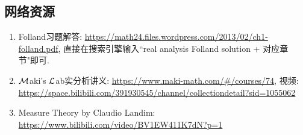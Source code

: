 \subsection*{网络资源}
\begin{enumerate}
    \item Folland习题解答: \url{https://math24.files.wordpress.com/2013/02/ch1-folland.pdf}, 直接在搜索引擎输入``real analysis Folland solution + 对应章节"即可. 
    \item $\mathcal{M}$aki's $\mathcal{L}$ab实分析讲义: \url{https://www.maki-math.com/#/courses/74}, 视频: \url{https://space.bilibili.com/391930545/channel/collectiondetail?sid=1055062}
    \item Measure Theory by Claudio Landim: \url{https://www.bilibili.com/video/BV1EW411K7dN?p=1}
\end{enumerate}